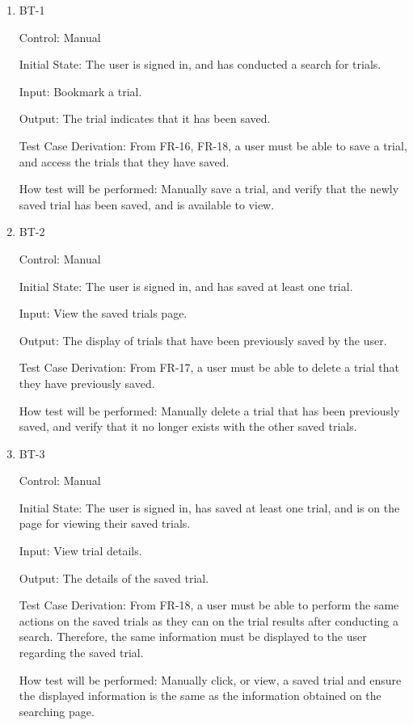 \documentclass[12pt, titlepage]{article}
\begin{document}
\begin{enumerate}

\item{BT-1\\}

Control: Manual
					
Initial State: The user is signed in, and has conducted a search for trials.
					
Input: Bookmark a trial.
					
Output: The trial indicates that it has been saved.

Test Case Derivation: From FR-16, FR-18, a user must be able to save a trial, and access the trials that they have saved.

How test will be performed: Manually save a trial, and verify that the newly saved trial has been saved, and is available to view.

\item{BT-2\\}

Control: Manual
					
Initial State: The user is signed in, and has saved at least one trial.
					
Input: View the saved trials page.
					
Output: The display of trials that have been previously saved by the user.

Test Case Derivation: From FR-17, a user must be able to delete a trial that they have previously saved.

How test will be performed: Manually delete a trial that has been previously saved, and verify that it no longer exists with the other saved trials.

\item{BT-3\\}

Control: Manual
					
Initial State: The user is signed in, has saved at least one trial, and is on the page for viewing their saved trials.
					
Input: View trial details.
					
Output: The details of the saved trial.

Test Case Derivation: From FR-18, a user must be able to perform the same actions on the saved trials as they can on the trial results after 
conducting a search. Therefore, the same information must be displayed to the user regarding the saved trial.

How test will be performed: Manually click, or view, a saved trial and ensure the displayed information is the same as the information obtained 
on the searching page.


\end{enumerate}
\end{document}
